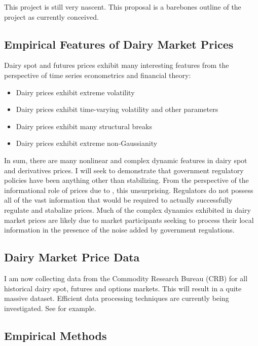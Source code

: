 \documentclass[11pt,]{article}
\def\tightlist{}
\begin{document}
This project is still very nascent. This proposal is a barebones outline
of the project as currently conceived.

\subsection{Empirical Features of Dairy Market
Prices}\label{empirical-features-of-dairy-market-prices}

Dairy spot and futures prices exhibit many interesting features from the
perspective of time series econometrics and financial theory:

\begin{itemize}
\tightlist
\item
  Dairy prices exhibit extreme volatility
\item
  Dairy prices exhibit time-varying volatility and other parameters
\item
  Dairy prices exhibit many structural breaks
\item
  Dairy prices exhibit extreme non-Gaussianity
\end{itemize}

In sum, there are many nonlinear and complex dynamic features in dairy
spot and derivatives prices. I will seek to demonstrate that government
regulatory policies have been anything other than stabilizing. From the
perspective of the informational role of prices due to
\citet{Hayek1945}, this unsurprising. Regulators do not possess all of
the vast information that would be required to actually successfully
regulate and stabalize prices. Much of the complex dynamics exhibited in
dairy market prices are likely due to market participants seeking to
process their local information in the presence of the noise added by
government regulations.

\subsection{Dairy Market Price Data}\label{dairy-market-price-data}

I am now collecting data from the Commodity Research Bureau (CRB) for
all historical dairy spot, futures and options markets. This will result
in a quite massive dataset. Efficient data processing techniques are
currently being investigated. See \citet{WuBethelGuLeinweberRubel} for
example.

\subsection{Empirical Methods}\label{empirical-methods}
\end{document}
